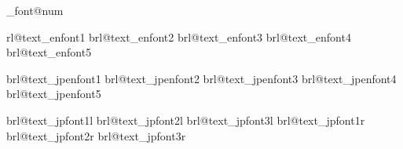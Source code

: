 \def\brl@math_fontdef#1#2{%
  {%
    \let\brl@do\brl@do_key%
    \csname brl@code_math_n_#2\endcsname%
  }%
  \expandafter\let\expandafter\brl@math_font@origchar\csname brl@char@code_\brl@char@key\endcsname
  \brl@char_getnewkey%
  \protected\expandafter\xdef\csname brl@code_math_\brl@math_font@namealph _#1\endcsname{\noexpand\brl@do{\brl@char@key}}%
  \expandafter\xdef\csname brl@char@load_\brl@char@key\endcsname{%
    \csname brl@code_math_\brl@math_font@namealph _#1\endcsname%
  }%
  \expandafter\xdef\csname brl@char@mean_\brl@char@key\endcsname{\brl@char_textstack{\brl@math_font@texcmd}{\brl@orig@eq\expandafter\noexpand\csname brl@math_font@texfont_\brl@math_font@namealph\endcsname{#1}\brl@orig@eq}}%
  \edef\brl@tmp{\ifnum\brl@char@charnum>\z@\advance\brl@char@charnum\the\brl@char@charnum\relax\fi}%
  \global\expandafter\let\csname brl@char@count_\brl@char@key\endcsname\brl@tmp%
  \edef\brl@tmp{\ifbrl@char@space\noexpand\brl@char@spacetrue\fi}%
  \global\expandafter\let\csname brl@char@space_\brl@char@key\endcsname\brl@tmp%
  \edef\brl@tmp{\the\brl@char@toks\expandafter\noexpand\brl@math_font@origchar}%
  \global\expandafter\let\csname brl@char@code_\brl@char@key\endcsname\brl@tmp%
  \ifbrl@option@hires%
    \global\expandafter\let\csname brl@char@draw_\brl@char@key\endcsname\brl@tmp%
  \fi%
}


\newcount\brl@text_font@num


\expandafter\edef\csname brl@text_enfont1
\expandafter\edef\csname brl@text_enfont2
\expandafter\edef\csname brl@text_enfont3
\expandafter\edef\csname brl@text_enfont4
\expandafter\edef\csname brl@text_enfont5

\expandafter\def\csname brl@text_jpenfont1
\expandafter\def\csname brl@text_jpenfont2
\expandafter\def\csname brl@text_jpenfont3
\expandafter\def\csname brl@text_jpenfont4
\expandafter\def\csname brl@text_jpenfont5

\expandafter\def\csname brl@text_jpfont1l
\expandafter\def\csname brl@text_jpfont2l
\expandafter\def\csname brl@text_jpfont3l
\expandafter\def\csname brl@text_jpfont1r
\expandafter\def\csname brl@text_jpfont2r
\expandafter\def\csname brl@text_jpfont3r
  

